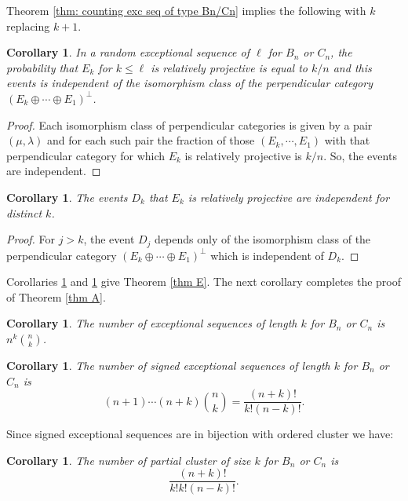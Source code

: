 \documentclass[11pt]{amsart}
\newtheorem{cor}[thm]{Corollary}
\theoremstyle{definition}
\theoremstyle{remark}
\numberwithin{equation}{section}
\begin{document}
Theorem \ref{thm: counting exc seq of type Bn/Cn} implies the following with $k$ replacing $k+1$. 

\begin{cor}\label{cor: independence of rel projectivity}
In a random exceptional sequence of $\ell$ for $B_n$ or $C_n$, the probability that $E_k$ for $k\le \ell$ is relatively projective is equal to $k/n$ and this events is independent of the isomorphism class of the perpendicular category $(E_k\oplus\cdots\oplus E_1)^\perp$.%
\end{cor}

\begin{proof}
    Each isomorphism class of perpendicular categories is given by a pair $(\mu,\lambda)$ and for each such pair the fraction of those $(E_k,\cdots,E_1)$ with that perpendicular category for which $E_k$ is relatively projective is $k/n$. So, the events are independent.
\end{proof}

\begin{cor}\label{cor: number of signed exc seq}
The events $D_k$ that $E_k$ is relatively projective are independent for distinct $k$.%
\end{cor}

\begin{proof}
    For $j>k$, the event $D_j$ depends only of the isomorphism class of the perpendicular category $(E_k\oplus\cdots\oplus E_1)^\perp$ which is independent of $D_k$.
\end{proof}

Corollaries \ref{cor: independence of rel projectivity} and \ref{cor: number of signed exc seq} give Theorem \ref{thm E}. The next corollary completes the proof of Theorem \ref{thm A}.

\begin{cor}\label{cor: no of exc seq for Bn/Cn}
The number of exceptional sequences of length $k$ for $B_n$ or $C_n$ is $n^k\binom nk$.
\end{cor}

\begin{cor}\label{cor: no of signed exc seq for Bn/Cn}
The number of signed exceptional sequences of length $k$ for $B_n$ or $C_n$ is 
\[
(n+1)\cdots(n+k)\binom nk= \frac{(n+k)!}{k!(n-k)!}.
\]
\end{cor}

Since signed exceptional sequences are in bijection with ordered cluster we have:

\begin{cor}\label{cor: no of clusters for Bn/Cn}
The number of partial cluster of size $k$ for $B_n$ or $C_n$ is 
\[
\frac{(n+k)!}{k!k!(n-k)!}.
\]
\end{cor}
\end{document}
